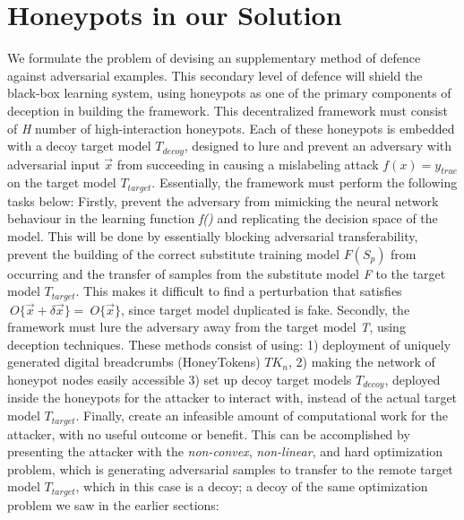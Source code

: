 \documentclass[grad,lot,lof,11pt,oneside,onehalfspace]{RUthesis}
\begin{document}
\section{Honeypots in our Solution}
We formulate the problem of devising an supplementary method of defence against adversarial examples. This secondary level of defence will shield the black-box learning system, using honeypots as one of the primary components of deception in building the framework.
\newline 
This decentralized framework must consist of \textit{H} number of high-interaction honeypots. Each of these honeypots is embedded with a decoy target model \textit{$T_{decoy}$}, designed to lure and prevent an adversary with adversarial input $\vec{x}$ from succeeding in causing a mislabeling attack \textit{$f(x) = y_{true}$} on the target model \textit{$T_{target}$}. Essentially, the framework must perform the following tasks below: 
\newline
Firstly, prevent the adversary from mimicking the neural network behaviour in the learning function \textit{f()} and replicating the decision space of the model. This will be done by essentially blocking adversarial transferability, prevent the building of the correct substitute training model \textit{$F(S_{p})$} from occurring and the transfer of samples from the substitute model \textit{F} to the target model \textit{$T_{target}$}. This makes it difficult to find a perturbation that satisfies $~{O}\{\vec{x}+\delta\vec{x}\} = ~{O}\{\vec{x}\}$, since target model duplicated is fake. \newline
Secondly, the framework must lure the adversary away from the target model \textit{T}, using deception techniques. These methods consist of using: 1) deployment of uniquely generated digital breadcrumbs (HoneyTokens) \textit{$TK_{n}$}, 2) making the network of honeypot nodes easily accessible 3) set up decoy target models \textit{$T_{decoy}$}, deployed inside the honeypots for the attacker to interact with, instead of the actual target model \textit{$T_{target}$}.
\newline
Finally, create an infeasible amount of computational work for the attacker, with no useful outcome or benefit. This can be accomplished by presenting the attacker with the \textit{non-convex}, \textit{non-linear}, and hard optimization problem, which is generating adversarial samples to transfer to the remote target model \textit{$T_{target}$}, which in this case is a decoy; a decoy of the same optimization problem we saw in the earlier sections:\newline
\end{document}
